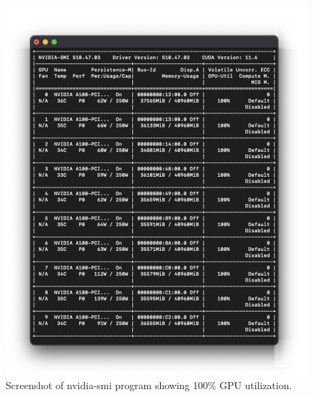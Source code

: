 \begin{figure}[htbp]
    \centering
    \includegraphics[width=\textwidth]{figures/nvidia-smi.png}
    \caption{Screenshot of nvidia-smi program showing 100\% GPU utilization.}
    \label{fig:htop-optimizer-computation}
\end{figure}

